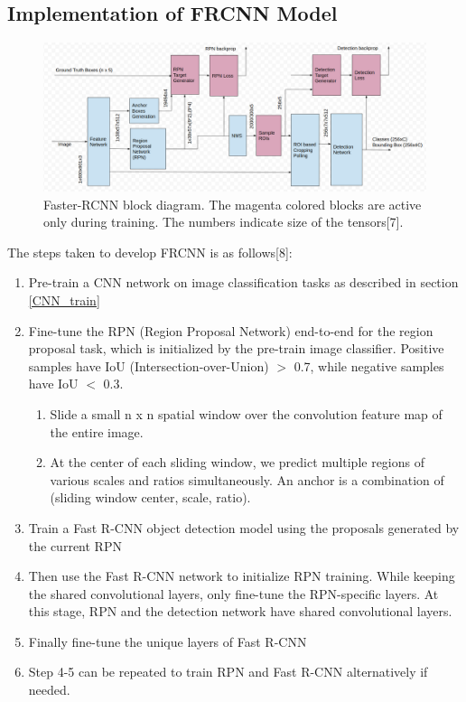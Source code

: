 \documentclass[12pt]{article}
\begin{document}
\subsection{Implementation of FRCNN Model}
\label{sec:FRCNN_impl}
\begin{figure}[H]
\centering
  \includegraphics[width=\linewidth]{./Images/FRCNN_model.png}
  \caption{Faster-RCNN block diagram. The magenta colored blocks are active only during training. The numbers indicate size of the tensors[7].}
  \label{fig:FRCNN_model}
\end{figure}

The steps taken to develop FRCNN is as follows[8]:
\begin{enumerate}
	\item Pre-train a CNN network on image classification tasks as described in section \ref{CNN_train}
	\item Fine-tune the RPN (Region Proposal Network) end-to-end for the region proposal task, which is initialized by the pre-train image classifier. Positive samples have IoU (Intersection-over-Union) $>$ 0.7, while negative samples have IoU $<$ 0.3. 
	\begin{enumerate}
		\item Slide a small n x n spatial window over the convolution feature map of the entire image.
		\item At the center of each sliding window, we predict multiple regions of various scales and ratios simultaneously. An anchor is a combination of (sliding window center, scale, ratio). 
	\end{enumerate}
	\item Train a Fast R-CNN object detection model using the proposals generated by the current RPN
	\item Then use the Fast R-CNN network to initialize RPN training. While keeping the shared convolutional layers, only fine-tune the RPN-specific layers. At this stage, RPN and the detection network have shared convolutional layers.
	\item Finally fine-tune the unique layers of Fast R-CNN
	\item Step 4-5 can be repeated to train RPN and Fast R-CNN alternatively if needed.
\end{enumerate}
\end{document}
